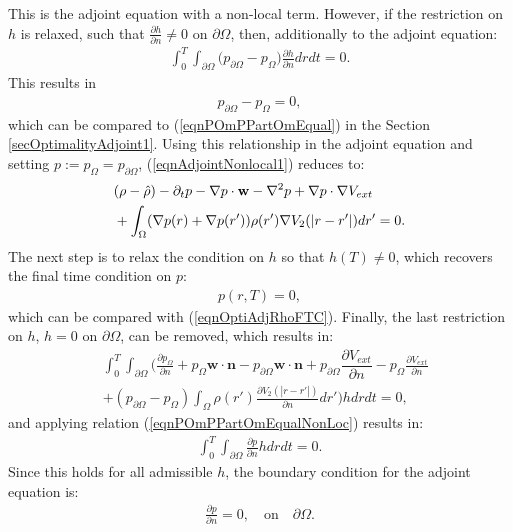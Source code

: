 This is the adjoint equation with a non-local term. However, if the restriction on $h$ is relaxed, such that $\frac{\partial h}{\partial n} \neq 0$ on $\partial \Omega$, then, additionally to the adjoint equation:
\begin{align*}
\int_0^T\int_{\partial \Omega} \bigg( p_{\partial \Omega}- p_\Omega \bigg) \frac{\partial h}{\partial n}  dr dt=0.
\end{align*}
This results in 
\begin{align}\label{eqnPOmPPartOmEqualNonLoc}
 p_{\partial \Omega}- p_\Omega=0,
\end{align}
which can be compared to (\ref{eqnPOmPPartOmEqual}) in the Section \ref{secOptimalityAdjoint1}. Using this relationship in the adjoint equation and setting $p:=p_\Omega =p_{\partial\Omega}$, (\ref{eqnAdjointNonlocal1}) reduces to:
\begin{align}
& (\rho- \hat{\rho})   - \partial_t  p  - \nabla p \cdot \mathbf{w}  - \nabla^2 p \notag 
+  \nabla p \cdot \nabla V_{ext}  \notag \\
&+ \int_\Omega (\nabla  p(r)+\nabla  p(r')) \rho(r') \nabla V_2(|r-r'|) dr' =0.
\end{align}
The next step is to relax the condition on $h$ so that $h(T) \neq 0$, which recovers the final time condition on $p$:
\begin{align*}
p(r,T)=0,
\end{align*}
which can be compared with (\ref{eqnOptiAdjRhoFTC}).
Finally, the last restriction on $h$, $h=0$ on $\partial \Omega$, can be removed, which results in:
\begin{align*}
 &\int_0^T\int_{\partial \Omega} 
\bigg(\frac{\partial p_\Omega }{\partial n} + p_\Omega  \mathbf{w} \cdot \mathbf{n} - p_{\partial \Omega} \mathbf{w} \cdot \mathbf{n} +  p_{\partial \Omega} \dfrac{\partial V_{ext}}{\partial n} - p_\Omega \frac{\partial V_{ext}}{\partial n}\\
& + ( p_{\partial \Omega} - p_\Omega)  \int_\Omega \rho(r') \frac{\partial V_2(|r-r'|)}{\partial n} dr'\bigg)h drdt=0,
\end{align*}
and applying relation (\ref{eqnPOmPPartOmEqualNonLoc}) results in:
\begin{align*}
\int_0^T\int_{\partial \Omega} \frac{\partial p }{\partial n}h drdt=0.
\end{align*}
Since this holds for all admissible $h$, the boundary condition for the adjoint equation is:
\begin{align*}
\frac{\partial p }{\partial n}=0, \quad \text{on} \quad \partial \Omega.
\end{align*}
